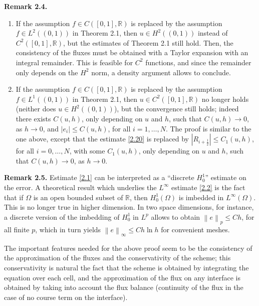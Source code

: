 \documentclass[a4paper]{article}
\numberwithin{equation}{section}
\begin{document}
\textbf{Remark 2.4.}
\begin{enumerate}
\item If the assumption $f \in C\left( {\left[ {0,1} \right],\mathbb{R}} \right)$ is replaced by the assumption $f \in {L^2}\left( {\left( {0,1} \right)} \right)$ in Theorem 2.1, then $u \in {H^2}\left( {\left( {0,1} \right)} \right)$ instead of ${C^2}\left( {\left[ {0,1} \right],\mathbb{R}} \right)$, but the estimates of Theorem 2.1 still hold. Then, the consistency of the fluxes must be obtained with a Taylor expansion with an integral remainder. This is feasible for $C^2$ functions, and since the remainder only depends on the $H^2$ norm, a density argument allows to conclude.
\item If the assumption $f \in C\left( {\left[ {0,1} \right],\mathbb{R}} \right)$ is replaced by the assumption $f \in {L^1}\left( {\left( {0,1} \right)} \right)$ in Theorem 2.1, then $u \in {C^2}\left( {\left[ {0,1} \right],\mathbb{R}} \right)$ no longer holds (neither does $u \in {H^2}\left( {\left( {0,1} \right)} \right)$), but the convergence still holds; indeed there exists $C\left(u,h\right)$, only depending on $u$ and $h$, such that $C\left(u,h\right)\to 0$, as $h\to 0$, and $\left| {{e_i}} \right| \le C\left( {u,h} \right)$, for all $i=1,\ldots,N$. The proof is similar to the one above, except that the estimate \eqref{2.20} is replaced by $\left| {{R_{i + \frac{1}{2}}}} \right| \le {C_1}\left( {u,h} \right)$, for all $i=0,\ldots,N$, with some $C_1\left(u,h\right)$, only depending on $u$ and $h$, such that $C\left(u,h\right)\to 0$, as $h\to 0$.
\end{enumerate}
\textbf{Remark 2.5.} Estimate \eqref{2.1} can be interpreted as a ``discrete $H_0^1$'' estimate on the error. A theoretical result which underlies the $L^\infty$ estimate \eqref{2.2} is the fact that if $\Omega$ is an open bounded subset of $\mathbb{R}$, then $H_0^1\left(\Omega\right)$ is imbedded in $L^\infty \left(\Omega\right)$. This is no longer true in higher dimension. In two space dimensions, for instance, a discrete version of the imbedding of $H_0^1$ in $L^p$ allows to obtain ${\left\| e \right\|_p} \le Ch$, for all finite $p$, which in turn yields ${\left\| e \right\|_\infty } \le Ch\ln h$ for convenient meshes.

The important features needed for the above proof seem to be the consistency of the approximation of the fluxes and the conservativity of the scheme; this conservativity is natural the fact that the scheme is obtained by integrating the equation over each cell, and the approximation of the flux on any interface is obtained by taking into account the flux balance (continuity of the flux in the case of no course term on the interface).
\end{document}
